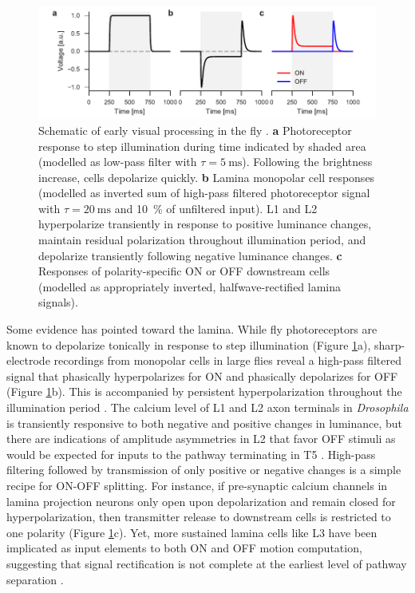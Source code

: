 \begin{figure}
    \centering
    \includegraphics[width=1.02\textwidth]{graphics/figure_lamina}
    \caption[Peripheral processing of ON and OFF]
    {Schematic of early visual processing in the fly \citep{Laughlin:1978aa,Eichner:2011ic}. \textbf{a} Photoreceptor response to step illumination during time indicated by shaded area (modelled as low-pass filter with $\tau = \SI{5}{\milli\second}$). Following the brightness increase, cells depolarize quickly. \textbf{b} Lamina monopolar cell responses (modelled as inverted sum of high-pass filtered photoreceptor signal with $\tau = \SI{20}{\milli\second}$ and \SI{10}{\percent} of unfiltered input). L1 and L2 hyperpolarize transiently in response to positive luminance changes, maintain residual polarization throughout illumination period, and depolarize transiently following negative luminance changes. \textbf{c} Responses of polarity-specific ON or OFF downstream cells (modelled as appropriately inverted, halfwave-rectified lamina signals).}
    \label{fig:lamina}
\end{figure}

Some evidence has pointed toward the lamina. While fly photoreceptors are known to depolarize tonically in response to step illumination (Figure \ref{fig:lamina}a), sharp-electrode recordings from monopolar cells in large flies reveal a high-pass filtered signal that phasically hyperpolarizes for ON and phasically depolarizes for OFF (Figure \ref{fig:lamina}b). This is accompanied by persistent hyperpolarization throughout the illumination period \citep{Laughlin:1978aa}. The calcium level of L1 and L2 axon terminals in \textit{Drosophila} is transiently responsive to both negative and positive changes in luminance, but there are indications of amplitude asymmetries in L2 that favor OFF stimuli as would be expected for inputs to the pathway terminating in T5 \citep{Reiff:2010eo,Clark:2011gw}. High-pass filtering followed by transmission of only positive or negative changes is a simple recipe for ON-OFF splitting. For instance, if pre-synaptic calcium channels in lamina projection neurons only open upon depolarization and remain closed for hyperpolarization, then transmitter release to downstream cells is restricted to one polarity  (Figure \ref{fig:lamina}c). Yet, more sustained lamina cells like L3 have been implicated as input elements to both ON and OFF motion computation, suggesting that signal rectification is not complete at the earliest level of pathway separation \citep{Silies:2013jp,Takemura:2017aa}.

